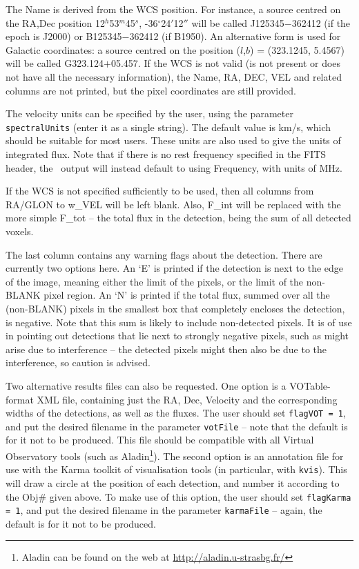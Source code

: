 The Name is derived from the WCS position. For instance, a source
centred on the RA,Dec position 12$^h$53$^m$45$^s$,
-36$^\circ$24$'$12$''$ will be called J125345$-$362412 (if the epoch
is J2000) or B125345$-$362412 (if B1950). An alternative form is used
for Galactic coordinates: a source centred on the position ($l$,$b$) =
(323.1245, 5.4567) will be called G323.124$+$05.457. If the WCS is not
valid (\ie is not present or does not have all the necessary
information), the Name, RA, DEC, VEL and related columns are not
printed, but the pixel coordinates are still provided.

The velocity units can be specified by the user, using the parameter
\texttt{spectralUnits} (enter it as a single string). The default
value is km/s, which should be suitable for most users. These units
are also used to give the units of integrated flux. Note that if there
is no rest frequency specified in the FITS header, the \duchamp\
output will instead default to using Frequency, with units of MHz.

If the WCS is not specified sufficiently to be used, then all columns
from RA/GLON to w\_VEL will be left blank. Also, F\_int will be
replaced with the more simple F\_tot -- the total flux in the
detection, being the sum of all detected voxels.

The last column contains any warning flags about the detection. There
are currently two options here. An `E' is printed if the detection is
next to the edge of the image, meaning either the limit of the pixels,
or the limit of the non-BLANK pixel region. An `N' is printed if the
total flux, summed over all the (non-BLANK) pixels in the smallest box
that completely encloses the detection, is negative. Note that this
sum is likely to include non-detected pixels. It is of use in pointing
out detections that lie next to strongly negative pixels, such as
might arise due to interference -- the detected pixels might then also
be due to the interference, so caution is advised.


Two alternative results files can also be requested. One option is a
VOTable-format XML file, containing just the RA, Dec, Velocity and the
corresponding widths of the detections, as well as the fluxes. The
user should set \texttt{flagVOT = 1}, and put the desired filename in
the parameter \texttt{votFile} -- note that the default is for it not
to be produced. This file should be compatible with all Virtual
Observatory tools (such as Aladin\footnote{ Aladin can be found on the
web at
\href{http://aladin.u-strasbg.fr/}{http://aladin.u-strasbg.fr/}}). The
second option is an annotation file for use with the Karma toolkit of
visualisation tools (in particular, with \texttt{kvis}). This will
draw a circle at the position of each detection, and number it
according to the Obj\# given above. To make use of this option, the
user should set \texttt{flagKarma = 1}, and put the desired filename
in the parameter \texttt{karmaFile} -- again, the default is for it
not to be produced.

